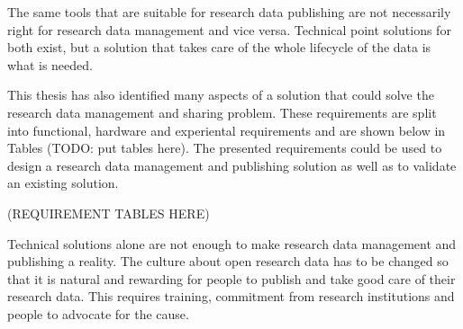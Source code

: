 The same tools that are suitable for research data publishing are not
necessarily right for research data management and vice versa. Technical
point solutions for both exist, but a solution that takes care of the whole
lifecycle of the data is what is needed.

This thesis has also identified many aspects of a solution that could solve the
research data management and sharing problem. These requirements are split
into functional, hardware and experiental requirements and are shown below
in Tables (TODO: put tables here). The presented requirements could be used
to design a research data management and publishing solution as well as to
validate an existing solution.

(REQUIREMENT TABLES HERE)

Technical solutions alone are not enough to make research data management
and publishing a reality. The culture about open research data has to be
changed so that it is natural and rewarding for people to publish and take
good care of their research data. This requires training, commitment from
research institutions and people to advocate for the cause.
